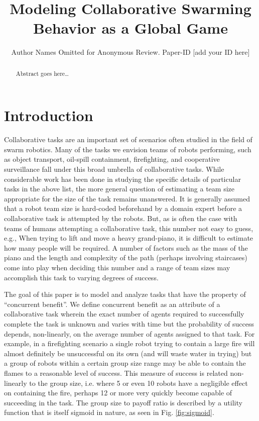 \documentclass[conference]{IEEETran}
\begin{document}
\title{Modeling Collaborative Swarming Behavior as a Global Game}
\author{Author Names Omitted for Anonymous Review. Paper-ID [add your ID here]}

\maketitle

\begin{abstract}
Abstract goes here\ldots
\end{abstract}

\IEEEpeerreviewmaketitle

\section{Introduction}
Collaborative tasks are an important set of scenarios often studied in the field of swarm robotics. Many of the tasks we envision teams of robots performing, such as object transport, oil-spill containment, firefighting, and cooperative surveillance fall under this broad umbrella of collaborative tasks. While considerable work has been done in studying the specific details of particular tasks in the above list, the more general question of estimating a team size appropriate for the size of the task remains unanswered. It is generally assumed that a robot team size is hard-coded beforehand by a domain expert before a collaborative task is attempted by the robots. But, as is often the case with teams of humans attempting a collaborative task, this number not easy to guess, e.g., When trying to lift and move a heavy grand-piano, it is difficult to estimate how many people will be required. A number of factors such as the mass of the piano and the length and complexity of the path (perhaps involving staircases) come into play when deciding this number and a range of team sizes may accomplish this task to varying degrees of success.

The goal of this paper is to model and analyze tasks that have the property of ``concurrent benefit''. We define concurrent benefit as an attribute of a collaborative task wherein the exact number of agents required to successfully complete the task is unknown and varies with time but the probability of success depends, non-linearly, on the average number of agents assigned to that task. For example, in a firefighting scenario a single robot trying to contain a large fire will almost definitely be unsuccessful on its own (and will waste water in trying) but a group of robots within a certain group size range may be able to contain the flames to a reasonable level of success. This measure of success is related non-linearly to the group size, i.e. where 5 or even 10 robots have a negligible effect on containing the fire, perhaps 12 or more very quickly become capable of succeeding in the task. The group size to payoff ratio is described by a utility function that is itself sigmoid in nature, as seen in Fig. \ref{fig:sigmoid}.
\end{document}
